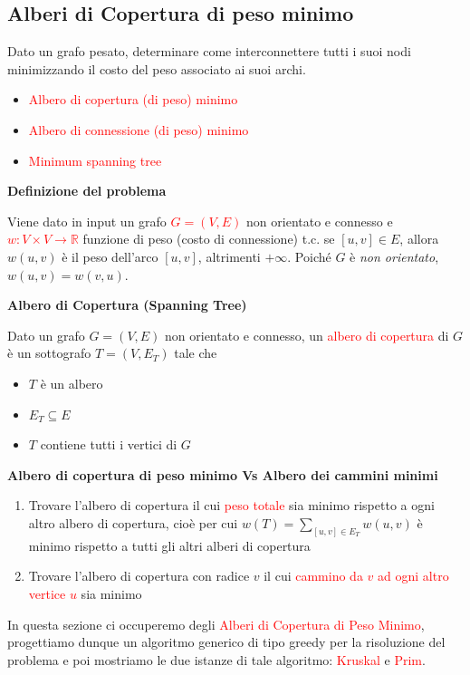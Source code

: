 \documentclass[../cheatSheetAlgoritmi.tex]{subfiles}
\begin{document}
\subsection{Alberi di Copertura di peso minimo}
Dato un grafo pesato, determinare come interconnettere tutti i suoi nodi minimizzando il costo del peso associato ai suoi archi.
\begin{itemize}
	\item \textcolor{red}{Albero di copertura (di peso) minimo}
	\item \textcolor{red}{Albero di connessione (di peso) minimo}
	\item \textcolor{red}{Minimum spanning tree}
\end{itemize}
\textbf{Definizione del problema}

Viene dato in input un grafo \textcolor{red}{$G = (V, E)$} non orientato e connesso e  \textcolor{red}{$w: V \times V \rightarrow \mathbb{R}$} funzione di peso (costo di connessione) t.c. se $[u, v] \in E$, allora $w(u, v)$ è il peso dell'arco $[u, v]$, altrimenti $+\infty$. Poiché $G$ è \emph{non orientato}, $w(u, v) = w(v, u)$.

\bigskip

\textbf{Albero di Copertura (Spanning Tree)}

Dato un grafo $G = (V, E)$ non orientato e connesso, un \textcolor{red}{albero di copertura} di $G$ è un sottografo $T = (V, E_{T})$ tale che 
\begin{itemize}
	\item $T$ è un albero
	\item $E_{T} \subseteq E$
	\item $T$ contiene tutti i vertici di $G$
\end{itemize}
\textbf{Albero di copertura di peso minimo Vs Albero dei cammini minimi}
\begin{enumerate}
	\item Trovare l'albero di copertura il cui \textcolor{red}{peso totale} sia minimo rispetto a ogni altro albero di copertura, cioè per cui $w(T) = \sum_{[u, v] \in E_{T}}w(u, v)$ è minimo rispetto a tutti gli altri alberi di copertura
	\item Trovare l'albero di copertura con radice $v$ il cui \textcolor{red}{cammino da $v$ ad ogni altro vertice $u$} sia minimo
\end{enumerate}
In questa sezione ci occuperemo degli \textcolor{red}{Alberi di Copertura di Peso Minimo}, progettiamo dunque un algoritmo generico di tipo greedy per la risoluzione del problema e poi mostriamo le due istanze di tale algoritmo: \textcolor{red}{Kruskal} e \textcolor{red}{Prim}.
\end{document}

